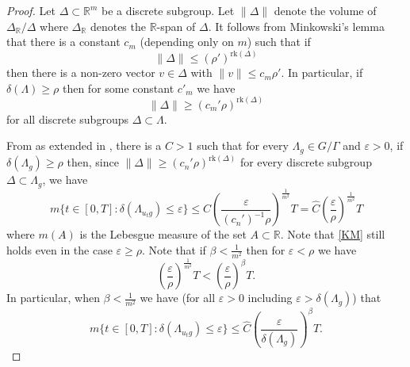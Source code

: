 \documentclass[10pt,reqno]{amsart}
\theoremstyle{Theorem}
\theoremstyle{definition}
\theoremstyle{remark}
\renewcommand{\epsilon}{\varepsilon}
\newcommand{\R}{\mathbb {R}}
\newcommand{\inv}{^{-1}}
\begin{document}
\begin{proof}
Let $\Delta\subset \R^m$ be a discrete subgroup.  Let $\|\Delta\|$ denote the volume of $\Delta_\R /\Delta$ where  $\Delta_\R$ denotes the $\R$-span of $\Delta$.  It follows from Minkowski's lemma that there is a constant $c_m$ (depending only on $m$) such that if
$$\|\Delta\| \le (\rho')^{\mathrm{rk}(\Delta)}$$ then there is a non-zero vector $v\in \Delta$ with $\|v\| \le c_m \rho'$.
In particular, if $\delta(\Lambda)\ge \rho$ then for some constant $c'_m$ we have $$
\|\Delta\| \ge (c_m' \rho)^{\mathrm{rk}(\Delta)}$$ for all discrete subgroups $\Delta\subset \Lambda$.

From \cite[Theorem 5.3]{MR1652916} as extended in \cite[Theorem 0.1]{MR2434296}, there is a $C>1$ such that  for every $\Lambda_g\in G/\Gamma$ and $\epsilon > 0$, if $\delta(\Lambda_g)\ge \rho$  then, since $
\|\Delta\| \ge (c_n' \rho)^{\mathrm{rk}(\Delta)}$ for every discrete subgroup $\Delta\subset \Lambda_g$,
we have
\begin{equation}\label{KM}m\{ t\in [0,T] : \delta( \Lambda_{u_tg}) \le \epsilon \}  \le C\left(\frac {\epsilon}{(c_n')\inv \rho}\right)^{\frac 1 {m^2}}T =
\hat C\left(\frac {\epsilon}{ \rho}\right)^{\frac 1 {m^2}}T\end{equation}
where $m(A)$ is  the Lebesgue measure of the set $A\subset \R$.
Note that   \eqref{KM} still holds %
even in the case $\epsilon \ge \rho$.
Note that if $\beta<{\frac 1 {m^2}}$ then for $\epsilon <\rho$ we have
$$\left(\frac {\epsilon}{ \rho}\right)^{\frac 1 {m^2}}T<\left(\frac {\epsilon}{ \rho}\right)^{\beta}T.$$
In particular, when $\beta<\frac 1 {m^2}$ we   have (for all $\epsilon>0$ including   $\epsilon>\delta(\Lambda_g)$) that
$$m\{ t\in [0,T] : \delta( \Lambda_{u_tg}) \le \epsilon \}  \le \hat C\left(\frac {\epsilon}{\delta(\Lambda_g)}\right)^{\beta}T.$$


\end{proof}
\end{document}
